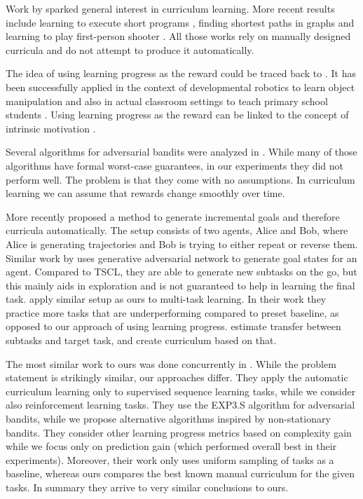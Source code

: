 \documentclass{article}
\begin{document}
Work by \citep{Bengio2009} sparked general interest in curriculum learning. More recent results include learning to execute short programs \citep{Zaremba2014}, finding shortest paths in graphs \citep{Graves2016} and learning to play first-person shooter \citep{wu2017training}. All those works rely on manually designed curricula and do not attempt to produce it automatically.

The idea of using learning progress as the reward could be traced back to \citep{schmidhuber1991curious}. It has been successfully applied in the context of developmental robotics to learn object manipulation \citep{oudeyer2007intrinsic,baranes2013active} and also in actual classroom settings to teach primary school students \citep{clement2015multi}. Using learning progress as the reward can be linked to the concept of intrinsic motivation \citep{Oudeyer2007,Schmidhuber2010}.

Several algorithms for adversarial bandits were analyzed in \citep{Auer2002}. While many of those algorithms have formal worst-case guarantees, in our experiments they did not perform well. The problem is that they come with no assumptions. In curriculum learning we can assume that rewards change smoothly over time.

More recently \citep{sukhbaatar2017intrinsic} proposed a method to generate incremental goals and therefore curricula automatically. The setup consists of two agents, Alice and Bob, where Alice is generating trajectories and Bob is trying to either repeat or reverse them. Similar work by \citep{held2017automatic} uses generative adversarial network to generate goal states for an agent. Compared to TSCL, they are able to generate new subtasks on the go, but this mainly aids in exploration and is not guaranteed to help in learning the final task. \citep{sharma2017online} apply similar setup as ours to multi-task learning. In their work they practice more tasks that are underperforming compared to preset baseline, as opposed to our approach of using learning progress. \citep{jain2017faster} estimate transfer between subtasks and target task, and create curriculum based on that.

The most similar work to ours was done concurrently in \citep{Graves2017}. While the problem statement is strikingly similar, our approaches differ. They apply the automatic curriculum learning only to supervised sequence learning tasks, while we consider also reinforcement learning tasks. They use the EXP3.S algorithm for adversarial bandits, while we propose alternative algorithms inspired by non-stationary bandits. They consider other learning progress metrics based on complexity gain while we focus only on prediction gain (which performed overall best in their experiments). Moreover, their work only uses uniform sampling of tasks as a baseline, whereas ours compares the best known manual curriculum for the given tasks. In summary they arrive to very similar conclusions to ours.
\end{document}
